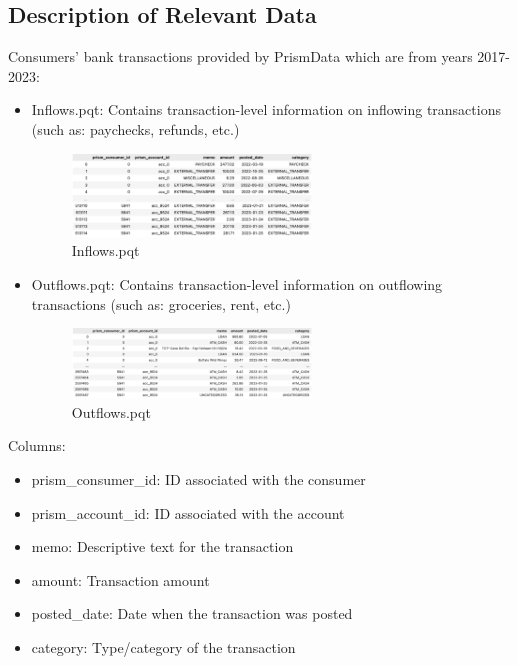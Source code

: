 \documentclass[12pt,letterpaper]{article}
\begin{document}
\subsection{Description of Relevant Data}
{Consumers' bank transactions provided by PrismData which are from years 2017-2023:}
\begin{itemize}
    \item {Inflows.pqt: Contains transaction-level information on inflowing transactions (such as: paychecks, refunds, etc.)}
    \begin{figure}[H]
        \centering
        \includegraphics[width=0.6\textwidth]{figure/inflows.png}
        \caption{Inflows.pqt}
        \label{fig:enter-label}
    \end{figure}
    
    \item {Outflows.pqt: Contains transaction-level information on outflowing transactions (such as: groceries, rent, etc.)}
    \begin{figure}[H]
        \centering
        \includegraphics[width=0.6\textwidth]{figure/outflows.png}
        \caption{Outflows.pqt}
        \label{fig:enter-label}
    \end{figure}
    
\end{itemize}
Columns:
\begin{itemize}
    \item {prism\_consumer\_id: ID associated with the consumer}
    \item {prism\_account\_id: ID associated with the account}
    \item {memo: Descriptive text for the transaction}
    \item {amount: Transaction amount}
    \item {posted\_date: Date when the transaction was posted}
    \item {category: Type/category of the transaction}
\end{itemize}
\end{document}
